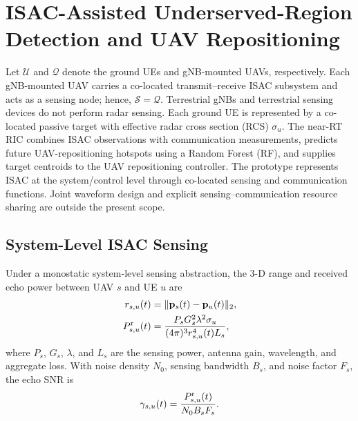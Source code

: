 \section{ISAC-Assisted Underserved-Region Detection and UAV Repositioning}
\label{sec:mathematical-model}

Let $\mathcal{U}$ and $\mathcal{Q}$ denote the ground UEs and
gNB-mounted UAVs, respectively. Each gNB-mounted UAV carries a co-located
transmit--receive ISAC subsystem and acts as a sensing node; hence,
$\mathcal{S}=\mathcal{Q}$. Terrestrial gNBs and terrestrial sensing
devices do not perform radar sensing. Each ground UE is represented
by a co-located passive target with effective radar cross section
(RCS) $\sigma_u$. The near-RT RIC combines ISAC observations with
communication measurements, predicts future UAV-repositioning hotspots
using a Random Forest (RF), and supplies target centroids to the UAV
repositioning controller.
The prototype represents ISAC at the system/control level through
co-located sensing and communication functions. Joint waveform
design and explicit sensing--communication resource sharing are
outside the present scope.

\subsection{System-Level ISAC Sensing}

Under a monostatic system-level sensing abstraction, the 3-D range
and received echo power between UAV $s$ and UE $u$ are
\begin{align}
 r_{s,u}(t)&=\|\mathbf{p}_s(t)-\mathbf{p}_u(t)\|_2,
 \label{eq:isac-range}\\
 P^{\rm r}_{s,u}(t)&=
 \frac{P_sG_s^2\lambda^2\sigma_u}
 {(4\pi)^3r_{s,u}^4(t)L_s},
 \label{eq:isac-echo}
\end{align}
where $P_s$, $G_s$, $\lambda$, and $L_s$ are the sensing power,
antenna gain, wavelength, and aggregate loss. With noise density
$N_0$, sensing bandwidth $B_s$, and noise factor $F_s$, the echo SNR
is
\begin{equation}
 \gamma_{s,u}(t)=
 \frac{P^{\rm r}_{s,u}(t)}{N_0B_sF_s}.
 \label{eq:isac-snr-compact}
\end{equation}

